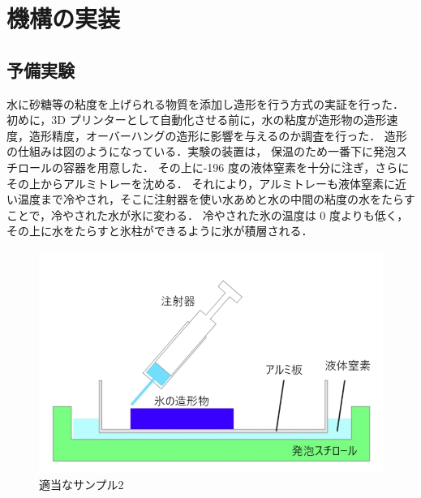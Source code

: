 \chapter{機構の実装}
\label{chp:first}

\section{予備実験}
\label{sec:paragraph}

水に砂糖等の粘度を上げられる物質を添加し造形を行う方式の実証を行った．
初めに，3D プリンターとして自動化させる前に，水の粘度が造形物の造形速度，造形精度，オーバーハングの造形に影響を与えるのか調査を行った． 
造形の仕組みは図のようになっている．実験の装置は， 保温のため一番下に発泡スチロールの容器を用意した．
その上に-196 度の液体窒素を十分に注ぎ，さらにその上からアルミトレーを沈める．
それにより，アルミトレーも液体窒素に近い温度まで冷やされ，そこに注射器を使い水あめと水の中間の粘度の水をたらすことで，冷やされた水が氷に変わる．
冷やされた氷の温度は 0 度よりも低く，その上に水をたらすと氷柱ができるように氷が積層される． 

\begin{figure}[H]
  \centering
  \includegraphics[width=10truecm]{./fig/yobi5.jpg}
  \caption{適当なサンプル2}
  \label{fig:ss}
\end{figure}

